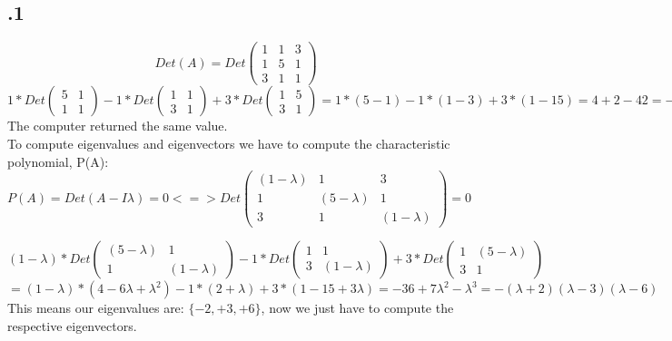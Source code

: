 \documentclass[a4paper]{article}
\begin{document}
\subsection*{.1}
$$ Det(A) = Det\left( \begin{matrix} 1 & 1 & 3 \\ 1 & 5 & 1 \\ 3 & 1 & 1 \end{matrix} \right)$$
$1 * Det \left( \begin{matrix} 5 & 1 \\ 1 & 1 \end{matrix} \right) - 1 * Det \left( \begin{matrix} 1 & 1 \\ 3 & 1 \end{matrix} \right) + 3 * Det \left( \begin{matrix} 1 & 5 \\ 3 & 1 \end{matrix} \right) = 1 * (5 - 1) -1 * (1 - 3) + 3 * (1 - 15) = 4 + 2 -42 = -36$\\
The computer returned the same value.\\
To compute eigenvalues and eigenvectors we have to compute the characteristic polynomial, P(A):\\
$$ P(A) = Det(A - I\lambda)= 0 <=> Det\left( \begin{matrix} (1 - \lambda) & 1 & 3 \\ 1 & (5 - \lambda) & 1 \\ 3 & 1 & (1 - \lambda) \end{matrix} \right) = 0$$

$(1 - \lambda) * Det \left( \begin{matrix} (5 - \lambda) & 1 \\ 1 & (1 - \lambda) \end{matrix} \right) - 1 * Det \left( \begin{matrix} 1 & 1 \\ 3 & (1 - \lambda) \end{matrix} \right) + 3 * Det \left( \begin{matrix} 1 & (5 - \lambda) \\ 3 & 1 \end{matrix} \right) $\\$= (1 - \lambda) * (4 - 6\lambda + \lambda^{2}) - 1 * (2 + \lambda) + 3 * (1 - 15 + 3\lambda) = -36 + 7\lambda^{2} - \lambda^{3} = -(\lambda + 2)(\lambda - 3)(\lambda - 6)$\\
This means our eigenvalues are: $\{-2, +3, +6\}$, now we just have to compute the respective eigenvectors.
\end{document}
